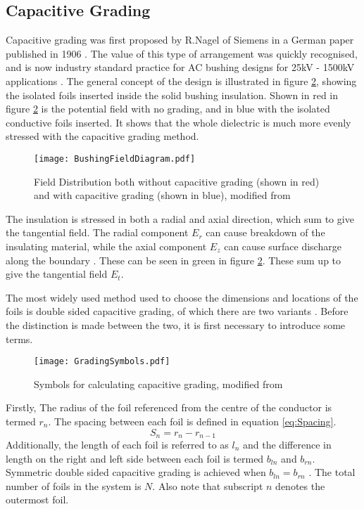 \subsection{Capacitive Grading} \label{ss:CapacitiveGrading}
Capacitive grading was first proposed by R.Nagel of Siemens in a German paper published in 1906 \cite{harlow2004electric}.
The value of this type of arrangement was quickly recognised, and is now industry standard practice for AC bushing designs for 25kV - 1500kV applications \cite{james2008condition}.
The general concept of the design is illustrated in figure \ref{figure:fieldgeneric}, showing the isolated foils inserted inside the solid bushing insulation.
Shown in red in figure \ref{figure:fieldgeneric} is the potential field with no grading, and in blue with the isolated conductive foils inserted.
It shows that the whole dielectric is much more evenly stressed with the capacitive grading method.
\begin{figure}[!h]
   \centering
   \texttt{[image: BushingFieldDiagram.pdf]}
   \caption{Field Distribution both without capacitive grading (shown in red) and with capacitive grading (shown in blue), modified from \cite{james2008condition}}
   \label{figure:fieldgeneric}
\end{figure}

The insulation is stressed in both a radial and axial direction, which sum to give the tangential field.
The radial component $E_r$ can cause breakdown of the insulating material, while the axial component $E_z$ can cause surface discharge along the boundary \cite{Ahmed11}.
These can be seen in green in figure \ref{figure:fieldgeneric}.
These sum up to give the tangential field $E_t$.

The most widely used method used to choose the dimensions and locations of the foils is double sided capacitive grading, of which there are two variants \cite{Ahmed11}.
Before the distinction is made between the two, it is first necessary to introduce some terms.
\begin{figure}[!h]
   \centering
   \texttt{[image: GradingSymbols.pdf]}
   \caption{Symbols for calculating capacitive grading, modified from \cite{Ahmed11}}
   \label{figure:fieldgeneric}
\end{figure}
Firstly, The radius of the foil referenced from the centre of the conductor is termed $r_n$. 
The spacing between each foil is defined in equation \ref{eq:Spacing}.
\begin{equation}
   \label{eq:Spacing}
   S_n = r_n - r_{n-1}
\end{equation}
Additionally, the length of each foil is referred to as $l_n$ and the difference in length on the right and left side between each foil is termed $b_{ln}$ and $b_{rn}$. 
Symmetric double sided capacitive grading is achieved when $b_{ln}=b_{rn}$ \cite{Ahmed11}. 
The total number of foils in the system is $N$.
Also note that subscript $n$ denotes the outermost foil.

